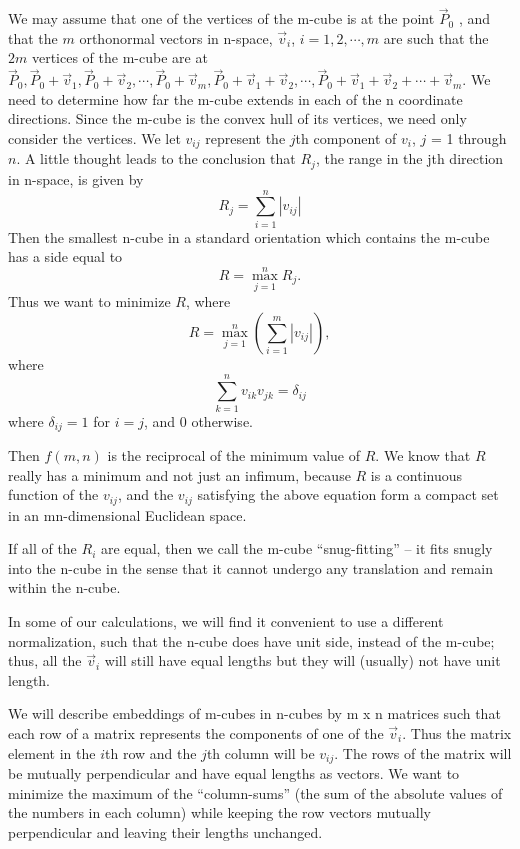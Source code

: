 We may assume that one of the vertices of the m-cube is at the
point $\vec{P}_0$ , and that the $m$ orthonormal vectors in n-space,
$\vec{v}_i$, $i = 1, 2, \cdots, m$
are such that the $2m$ vertices of the m-cube are at
$\vec{P}_0, \vec{P}_0+\vec{v}_1, \vec{P}_0+\vec{v}_2, \cdots, \vec{P}_0+\vec{v}_m,
\vec{P}_0+\vec{v}_1+\vec{v}_2, \cdots,
\vec{P}_0+\vec{v}_1+\vec{v}_2+\cdots+\vec{v}_m$. 
We need to determine how far the m-cube extends in each of the n coordinate
directions. Since the m-cube is the convex hull of its vertices, we need only
consider the vertices. We let $v_{ij}$ represent the $j$th component of $v_i$,
$j$ = 1 through $n$. A little thought leads to the conclusion that $R_j$, the
range in the jth direction in n-space, is given by
\begin{equation*}
R_j = \sum_{i=1}^{n} | v_{ij} |
\end{equation*}
Then the smallest n-cube in a standard orientation which contains the m-cube
has a side equal to
\begin{equation*}
R = \max_{j=1}^{n} R_j.
\end{equation*}
Thus we want to minimize $R$, where
\begin{equation*}
R = \max_{j=1}^{n} \left( \sum_{i=1}^{m} | v_{ij} | \right),
\end{equation*}
where
\begin{equation*}
\sum_{k=1}^{n} v_{ik} v_{jk} = \delta_{ij}
\end{equation*}
where $\delta_{ij} = 1$ for $i = j$, and $0$ otherwise.

Then $f(m,n)$ is the reciprocal of the minimum value of $R$. We know that $R$
really has a minimum and not just an infimum, because $R$ is a continuous
function of the $v_{ij}$, and the $v_{ij}$ satisfying the above equation form
a compact set in an mn-dimensional Euclidean space.

If all of the $R_i$ are equal, then we call the m-cube ``snug-fitting'' --
it fits snugly into the n-cube in the sense that it cannot undergo any
translation and remain within the n-cube.

In some of our calculations, we will find it convenient to use a
different normalization, such that the n-cube does have unit side,
instead of the m-cube; thus, all the $\vec{v}_i$ will still have equal
lengths but they will (usually) not have unit length.

We will describe embeddings of m-cubes in n-cubes by m x n
matrices such that each row of a matrix represents the components of
one of the $\vec{v}_i$. Thus the matrix element in the $i$th row and the $j$th
column will be $v_{ij}$. The rows of the matrix will be mutually perpendicular
and have equal lengths as vectors. We want to minimize the maximum of the
``column-sums'' (the sum of the absolute values of the numbers in each
column) while keeping the row vectors mutually perpendicular and leaving
their lengths unchanged.

